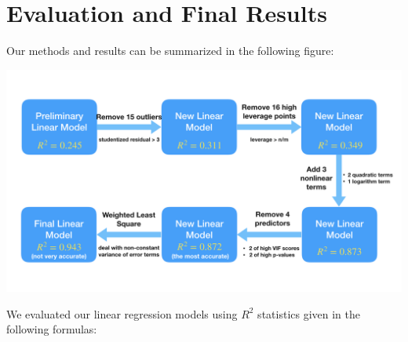 \documentclass{article}
\begin{document}
\section{Evaluation and Final Results}
\label{marker}
Our methods and results can be summarized in the following figure:
\begin{center}
\includegraphics[width = .89\textwidth]{images/work_flow.png}
\end{center}
We evaluated our linear regression models using $R^2$ statistics given in the following formulas:
\end{document}
